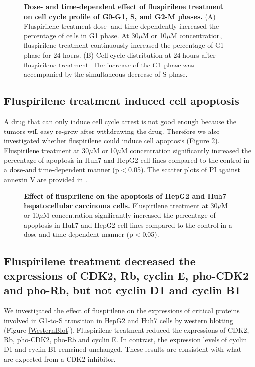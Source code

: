 \documentclass[10pt,letterpaper]{article}
\begin{document}
\begin{figure}%
\caption{{\bf Dose- and time-dependent effect of fluspirilene treatment on cell cycle profile of G0-G1, S, and G2-M phases.} (A) Fluspirilene treatment dose- and time-dependently increased the percentage of cells in G1 phase. At 30$\mu$M or 10$\mu$M concentration, fluspirilene treatment continuously increased the percentage of G1 phase for 24 hours. (B) Cell cycle distribution at 24 hours after fluspirilene treatment. The increase of the G1 phase was accompanied by the simultaneous decrease of S phase.}
\label{CellCycle}
\end{figure}

\subsection*{Fluspirilene treatment induced cell apoptosis}

A drug that can only induce cell cycle arrest is not good enough because the tumors will easy re-grow after withdrawing the drug. Therefore we also investigated whether fluspirilene could induce cell apoptosis (Figure \ref{CellApoptosis}). Fluspirilene treatment at 30$\mu$M or 10$\mu$M concentration significantly increased the percentage of apoptosis in Huh7 and HepG2 cell lines compared to the control in a dose-and time-dependent manner (p$<$0.05). The scatter plots of PI against annexin V are provided in .

\begin{figure}%
\caption{{\bf Effect of fluspirilene on the apoptosis of HepG2 and Huh7 hepatocellular carcinoma cells.} Fluspirilene treatment at 30$\mu$M or 10$\mu$M concentration significantly increased the percentage of apoptosis in Huh7 and HepG2 cell lines compared to the control in a dose-and time-dependent manner (p$<$0.05).}
\label{CellApoptosis}
\end{figure}

\subsection*{Fluspirilene treatment decreased the expressions of CDK2, Rb, cyclin E, pho-CDK2 and pho-Rb, but not cyclin D1 and cyclin B1}

We investigated the effect of fluspirilene on the expressions of critical proteins involved in G1-to-S transition in HepG2 and Huh7 cells by western blotting (Figure \ref{WesternBlot}). Fluspirilene treatment reduced the expressions of CDK2, Rb, pho-CDK2, pho-Rb and cyclin E. In contrast, the expression levels of cyclin D1 and cyclin B1 remained unchanged. These results are consistent with what are expected from a CDK2 inhibitor.
\end{document}
